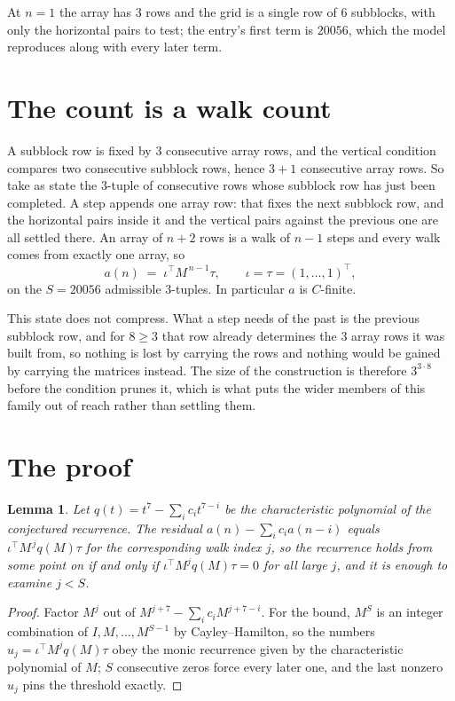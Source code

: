 \documentclass[11pt,a4paper]{article}
\theoremstyle{plain}
\newtheorem{lemma}[theorem]{Lemma}
\theoremstyle{definition}
\begin{document}
At $n=1$ the array has $3$ rows and the grid is a single row of $6$
subblocks, with only the horizontal pairs to test; the entry's first term is
$20056$, which the model reproduces along with every later term.

\section{The count is a walk count}

A subblock row is fixed by $3$ consecutive array rows, and the vertical condition compares
two consecutive subblock rows, hence $3+1$ consecutive array rows. So take as state the
$3$-tuple of consecutive rows whose subblock row has just been completed. A step appends one
array row: that fixes the next subblock row, and the horizontal pairs inside it and the
vertical pairs against the previous one are all settled there. An array of $n+2$ rows is
a walk of $n-1$ steps and every walk comes from exactly one array, so
\[
a(n)\;=\;\iota^{\!\top}M^{\,n-1}\tau,\qquad\iota=\tau=(1,\dots,1)^{\!\top},
\]
on the $S=20056$ admissible $3$-tuples. In particular $a$ is $C$-finite.

This state does not compress. What a step needs of the past is the previous subblock row, and
for $8\ge3$ that row already determines the $3$ array rows it was built from, so nothing
is lost by carrying the rows and nothing would be gained by carrying the matrices instead. The
size of the construction is therefore $3^{3\cdot8}$ before the condition prunes
it, which is what puts the wider members of this family out of reach rather than settling them.

\section{The proof}

\begin{lemma}\label{lem:crit}
Let $q(t)=t^{7}-\sum_i c_it^{7-i}$ be the characteristic polynomial of the
conjectured recurrence. The residual $a(n)-\sum_ic_ia(n-i)$ equals
$\iota^{\!\top}M^{\,j}q(M)\tau$ for the corresponding walk index $j$, so the recurrence
holds from some point on if and only if $\iota^{\!\top}M^{j}q(M)\tau=0$ for all large $j$,
and it is enough to examine $j<S$.
\end{lemma}

\begin{proof}
Factor $M^{j}$ out of $M^{j+7}-\sum_ic_iM^{j+7-i}$. For the bound, $M^{S}$
is an integer combination of $I,M,\dots,M^{S-1}$ by Cayley--Hamilton, so the numbers
$u_j=\iota^{\!\top}M^{j}q(M)\tau$ obey the monic recurrence given by the characteristic
polynomial of $M$; $S$ consecutive zeros force every later one, and the last nonzero $u_j$
pins the threshold exactly.
\end{proof}
\end{document}
